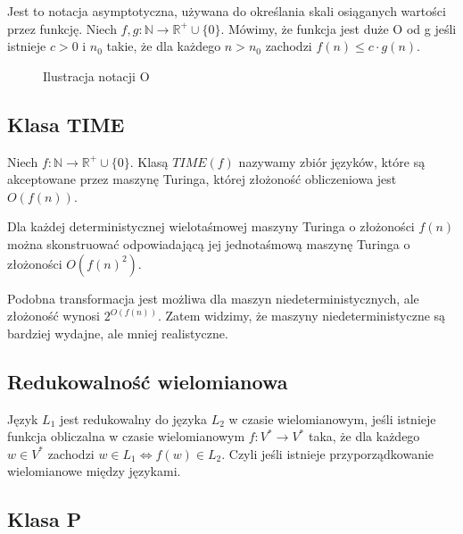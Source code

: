 \documentclass{../notatki}
\begin{document}
Jest to notacja asymptotyczna, używana do określania skali osiąganych wartości
przez funkcję. Niech $f, g: \mathbb{N} \rightarrow \mathbb{R}^+ \cup \{0\}$.
Mówimy, że funkcja jest duże O od g jeśli istnieje $c > 0$ i $n_0$ takie, że
dla każdego $n > n_0$ zachodzi $f(n) \le c \cdot g(n)$.

\begin{figure}[h]
  \centering
  \caption{Ilustracja notacji O}
\end{figure}

\subsection{Klasa TIME}

Niech $f: \mathbb{N} \rightarrow \mathbb{R}^+ \cup \{0\}$. Klasą $TIME(f)$
nazywamy zbiór języków, które są akceptowane przez maszynę Turinga, której
złożoność obliczeniowa jest $O(f(n))$.

Dla każdej deterministycznej wielotaśmowej maszyny Turinga o złożoności $f(n)$
można skonstruować odpowiadającą jej jednotaśmową maszynę Turinga o złożoności
$O(f(n)^2)$.

Podobna transformacja jest możliwa dla maszyn niedeterministycznych, ale
złożoność wynosi $2^{O(f(n))}$. Zatem widzimy, że maszyny niedeterministyczne
są bardziej wydajne, ale mniej realistyczne.

\subsection{Redukowalność wielomianowa}

Język $L_1$ jest redukowalny do języka $L_2$ w czasie wielomianowym, jeśli
istnieje funkcja obliczalna w czasie wielomianowym $f: V^*
\rightarrow V^*$ taka,
że dla każdego $w \in V^*$ zachodzi $w \in L_1 \Leftrightarrow f(w) \in L_2$.
Czyli jeśli istnieje przyporządkowanie wielomianowe między językami.

\subsection{Klasa P}
\end{document}

